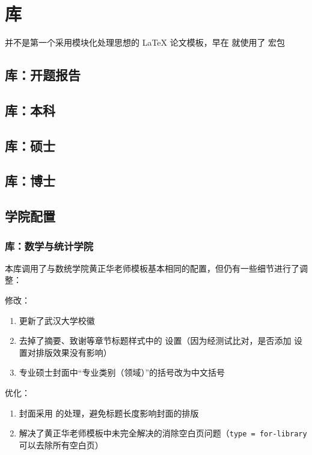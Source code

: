
\chapter{库}

 并不是第一个采用模块化处理思想的 \LaTeX{} 论文模板，早在  就使用了  宏包

\section{ 库：开题报告}


\section{ 库：本科}


\section{ 库：硕士}


\section{ 库：博士}


\section{学院配置}

\subsection{ 库：数学与统计学院}

本库调用了与数统学院黄正华老师模板基本相同的配置，但仍有一些细节进行了调整：

修改：
\begin{enumerate}
  \item 更新了武汉大学校徽\cite{whulogo}
  \item 去掉了摘要、致谢等章节标题样式中的  设置（因为经测试比对，是否添加  设置对排版效果没有影响）
  \item 专业硕士封面中“专业类别（领域）”的括号改为中文括号
\end{enumerate}

优化：
\begin{enumerate}
  \item 封面采用  的处理，避免标题长度影响封面的排版
  \item 解决了黄正华老师模板中未完全解决的消除空白页问题（\verb|type = for-library| 可以去除所有空白页）
\end{enumerate}


